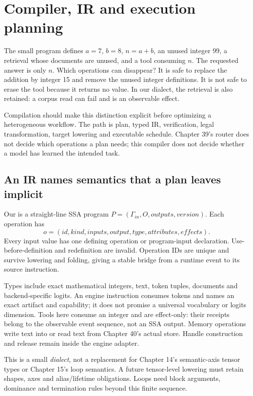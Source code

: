 \chapter{Compiler, IR and execution planning}
\label{evod41:chapter}

The small program defines $a=7$, $b=8$, $n=a+b$, an unused integer 99,
a retrieval whose documents are unused, and a tool consuming $n$. The requested
answer is only $n$. Which operations can disappear? It is safe to replace
the addition by integer 15 and remove the unused integer definitions. It is
not safe to erase the tool because it returns no value. In our dialect, the
retrieval is also retained: a corpus read can fail and is an observable effect.

Compilation should make this distinction explicit before optimizing a
heterogeneous workflow. The path is plan, typed IR, verification, legal
transformation, target lowering and executable schedule. Chapter 39's router
does not decide which operations a plan needs; this compiler does not decide
whether a model has learned the intended task.

\section{An IR names semantics that a plan leaves implicit}
\label{evod41:ir}
Our  is a straight-line SSA program
$P=(\Gamma_{in},O,outputs,version)$. Each operation has
\[
 o=(id,kind,inputs,output,type,attributes,effects).
\]
Every input value has one defining operation or program-input declaration.
Use-before-definition and redefinition are invalid. Operation IDs are unique
and survive lowering and folding, giving a stable bridge from a runtime
event to its source instruction.

Types include exact mathematical integers, text, token tuples, documents and
backend-specific logits. An engine instruction consumes tokens and names an
exact artifact and capability; it does not promise a universal vocabulary
or logits dimension. Tools here consume an integer and are effect-only:
their receipts belong to the observable event sequence, not an SSA output.
Memory operations write text into or read text from Chapter 40's actual store.
Handle construction and release remain inside the engine adapter.

This is a small \emph{dialect}, not a replacement for Chapter 14's semantic-axis
tensor types or Chapter 15's loop semantics. A future tensor-level lowering
must retain shapes, axes and alias/lifetime obligations. Loops need block
arguments, dominance and termination rules beyond this finite sequence.

